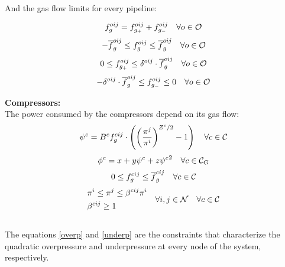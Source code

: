 And the gas flow limits for every pipeline:

\begin{equation}
{f}^{oij}_{g} =  f^{oij}_{g_+} + {f}^{oij}_{g_-} \quad \forall o \in {\cal{O}}
\label{fgo}
\end{equation}
\begin{equation}
 - \overline{f}^{oij}_{g}  \le f^{oij}_{g} \le  \overline{f}^{oij}_{g}  \quad \forall o \in {\cal{O}}
\label{fgo_limits}
\end{equation}
\begin{equation}
0 \le f^{oij}_{g_+} \le \delta^{oij} \cdot \overline{f}^{oij}_{g} \quad \forall o \in {\cal{O}}
\label{fgopos_limits}
\end{equation}
\begin{equation}
- \delta^{oij} \cdot \overline{f}^{oij}_{g} \le f^{oij}_{g_-} \le 0 \quad \forall o \in {\cal{O}}
\label{fgoneg_limits}
\end{equation}



\textbf{Compressors:}\\

The power consumed by the compressors depend on its gas flow:\\

\begin{equation}
\psi^{c} = {B^{c}}{f}^{cij}_{g} \cdot \left( {\left( \frac{\pi^{j}}{\pi^{i}} \right)}^{Z^{c} / 2} - 1 \right)   \quad \forall c \in {\cal{C}}
\label{hp_fc}
\end{equation}
\begin{equation} 
{\phi}^{c} = x + y \psi^{c} +  z {\psi^{c}}^{2}  \quad \forall c \in {\cal{C}}_{G}
\label{g_fc}
\end{equation}
\begin{equation}
0 \le {f}^{cij}_{g} \le \overline{f}^{cij}_{g}  \quad \forall c \in {\cal{C}}
\label{gfa_limits}
\end{equation}
\begin{equation}
\begin{aligned}
&\pi^{i} \le \pi^{j} \le \beta^{cij} \pi^{i}\\
&\beta^{cij} \ge 1 \\
\end{aligned}
\quad \forall i,j \in {\cal{N}} \quad \forall c \in {\cal{C}}
\label{presa_rel}
\end{equation}
\\

The equations \ref{overp} and \ref{underp} are the constraints that characterize the quadratic overpressure and underpressure at every node of the system, respectively. 

